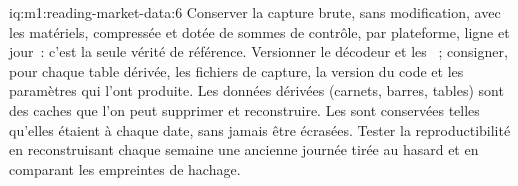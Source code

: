 \begin{solution}{iq:m1:reading-market-data:6}
Conserver la capture brute, sans modification, avec les  matériels,
compressée et dotée de sommes de contrôle, par plateforme, ligne et jour~: c'est la seule
vérité de référence. Versionner le décodeur et les ~; consigner, pour chaque table dérivée,
les fichiers de capture, la version du code et les paramètres qui l'ont produite.
Les données dérivées (carnets, barres, tables) sont des caches que l'on peut supprimer et
reconstruire. Les  sont conservées telles qu'elles étaient à chaque date, sans jamais être écrasées. Tester
la reproductibilité en reconstruisant chaque semaine une ancienne journée tirée au hasard et en comparant
les empreintes de hachage.
\end{solution}
